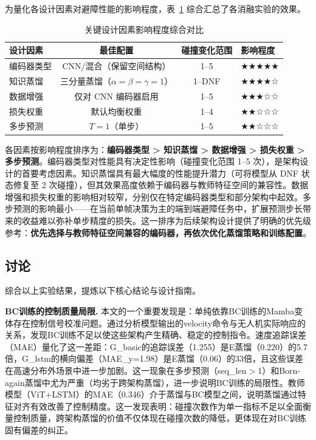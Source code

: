 \documentclass[12pt,a4paper]{article}
\numberwithin{equation}{section}
\numberwithin{figure}{section}
\numberwithin{table}{section}
\begin{document}
为量化各设计因素对避障性能的影响程度，表~\ref{tab:factor-impact} 综合汇总了各消融实验的效果。

\begin{table}[H]
\centering
\caption{关键设计因素影响程度综合对比}
\label{tab:factor-impact}
\begin{tabular}{lccl}
\toprule
设计因素 & 最佳配置 & 碰撞变化范围 & 影响程度 \\
\midrule
编码器类型 & CNN/混合（保留空间结构） & 1--5 & ★★★★★ \\
知识蒸馏 & 三分量蒸馏（$\alpha=\beta=\gamma=1$） & 1--DNF & ★★★★☆ \\
数据增强 & 仅对 CNN 编码器启用 & 1--5 & ★★★☆☆ \\
损失权重 & 默认均衡权重 & 1--4 & ★★☆☆☆ \\
多步预测 & $T=1$（单步） & 1--5 & ★★☆☆☆ \\
\bottomrule
\end{tabular}
\end{table}

各因素按影响程度排序为：\textbf{编码器类型 > 知识蒸馏 > 数据增强 > 损失权重 > 多步预测}。编码器类型对性能具有决定性影响（碰撞变化范围 1--5 次），是架构设计的首要考虑因素。知识蒸馏具有最大幅度的性能提升潜力（可将模型从 DNF 状态修复至 2 次碰撞），但其效果高度依赖于编码器与教师特征空间的兼容性。数据增强和损失权重的影响相对较窄，分别仅在特定编码器类型和部分架构中起效。多步预测的影响最小——在当前单帧决策为主的端到端避障任务中，扩展预测步长带来的收益难以弥补单步精度的损失。这一排序为后续架构设计提供了明确的优先级参考：\textbf{优先选择与教师特征空间兼容的编码器，再依次优化蒸馏策略和训练配置}。

\subsection{讨论}
\label{sec:discussion}

综合以上实验结果，提炼以下核心结论与设计指南。

\textbf{BC训练的控制质量局限.} 本文的一个重要发现是：单纯依靠BC训练的Mamba变体存在控制信号校准问题。通过分析模型输出的velocity命令与无人机实际响应的关系，发现BC训练不足以使这些架构产生精确、稳定的控制指令。速度追踪误差（MAE）量化了这一差距：G\_basic的追踪误差（1.255）是E蒸馏（0.220）的5.7倍，G\_lstm的横向偏差（MAE\_y=1.98）是E蒸馏（0.06）的33倍，且这些误差在高速分布外场景中进一步加剧。这一现象在多步预测（seq\_len$>$1）和Born-again蒸馏中尤为严重（均劣于跨架构蒸馏），进一步说明BC训练的局限性。教师模型（ViT+LSTM）的MAE（0.346）介于蒸馏与BC模型之间，说明蒸馏通过特征对齐有效改善了控制精度。这一发现表明：碰撞次数作为单一指标不足以全面衡量控制质量，跨架构蒸馏的价值不仅体现在碰撞次数的降低，更体现在对BC训练固有偏差的纠正。
\end{document}
